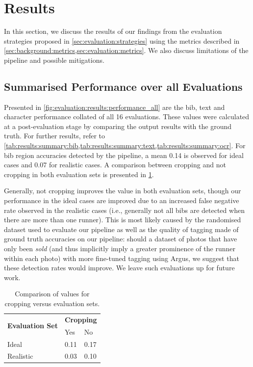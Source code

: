 \section{Results}
\label{sec:evaluation:results}

In this section, we discuss the results of our findings from the evaluation strategies proposed in \cref{sec:evaluation:strategies} using the metrics described in \cref{sec:background:metrics,sec:evaluation:metrics}. We also discuss limitations of the pipeline and possible mitigations.

\subsection{Summarised Performance over all Evaluations}
\label{sec:evaluation:results}

Presented in \cref{fig:evaluation:results:performance_all} are the bib, text and character performance collated of all 16 evaluations. These values were calculated at a post-evaluation stage by comparing the output results with the ground truth. For further results, refer to \cref{tab:results:summary:bib,tab:results:summary:text,tab:results:summary:ocr}. For bib region accuracies detected by the pipeline, a mean \fscore{} 0.14 is observed for ideal cases and 0.07 for realistic cases. A comparison between cropping and not cropping in both evaluation sets is presented in \cref{tab:evaluation:fscore_comparison}.

Generally, not cropping improves the \fscore{} value in both evaluation sets, though our performance in the ideal cases are improved due to an increased false negative rate observed in the realistic cases (i.e., generally not all bibs are detected when there are more than one runner). This is most likely caused by the randomised dataset used to evaluate our pipeline as well as the quality of tagging made of ground truth accuracies on our pipeline: should a dataset of photos that have only been \textit{sold} (and thus implicitly imply a greater prominence of the runner within each photo) with more fine-tuned tagging using Argus, we suggest that these detection rates would improve. We leave such evaluations up for future work.

\begin{table}[h]
\centering
\caption[Comparison of our \fscore{} results]{Comparison of \fscore{} values for cropping versus evaluation sets.}
\label{tab:evaluation:fscore_comparison}
\begin{tabular}{lll}
\hline
\multicolumn{1}{c}{\multirow{2}{*}{\textbf{Evaluation Set}}} & \multicolumn{2}{c}{\textbf{Cropping}} \\ \cline{2-3} 
\multicolumn{1}{c}{}                                         & Yes                & No               \\ \hline
Ideal                                                        & 0.11               & 0.17             \\ 
Realistic                                                    & 0.03               & 0.10             \\ \hline
\end{tabular}
\end{table}

